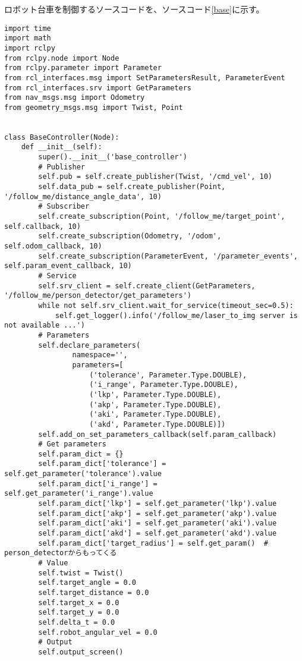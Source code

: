 ロボット台車を制御するソースコードを、ソースコード\ref{base}に示す。
\begin{lstlisting}[caption=base\_controller.py, label=base]
import time
import math
import rclpy
from rclpy.node import Node
from rclpy.parameter import Parameter
from rcl_interfaces.msg import SetParametersResult, ParameterEvent
from rcl_interfaces.srv import GetParameters
from nav_msgs.msg import Odometry
from geometry_msgs.msg import Twist, Point


class BaseController(Node):
    def __init__(self):
        super().__init__('base_controller')
        # Publisher
        self.pub = self.create_publisher(Twist, '/cmd_vel', 10)
        self.data_pub = self.create_publisher(Point, '/follow_me/distance_angle_data', 10)
        # Subscriber
        self.create_subscription(Point, '/follow_me/target_point', self.callback, 10)
        self.create_subscription(Odometry, '/odom', self.odom_callback, 10)
        self.create_subscription(ParameterEvent, '/parameter_events', self.param_event_callback, 10)
        # Service
        self.srv_client = self.create_client(GetParameters, '/follow_me/person_detector/get_parameters')
        while not self.srv_client.wait_for_service(timeout_sec=0.5):
            self.get_logger().info('/follow_me/laser_to_img server is not available ...')
        # Parameters
        self.declare_parameters(
                namespace='',
                parameters=[
                    ('tolerance', Parameter.Type.DOUBLE),
                    ('i_range', Parameter.Type.DOUBLE),
                    ('lkp', Parameter.Type.DOUBLE),
                    ('akp', Parameter.Type.DOUBLE),
                    ('aki', Parameter.Type.DOUBLE),
                    ('akd', Parameter.Type.DOUBLE)])
        self.add_on_set_parameters_callback(self.param_callback)
        # Get parameters
        self.param_dict = {}
        self.param_dict['tolerance'] = self.get_parameter('tolerance').value
        self.param_dict['i_range'] = self.get_parameter('i_range').value
        self.param_dict['lkp'] = self.get_parameter('lkp').value
        self.param_dict['akp'] = self.get_parameter('akp').value
        self.param_dict['aki'] = self.get_parameter('aki').value
        self.param_dict['akd'] = self.get_parameter('akd').value
        self.param_dict['target_radius'] = self.get_param()  # person_detectorからもってくる
        # Value
        self.twist = Twist()
        self.target_angle = 0.0
        self.target_distance = 0.0
        self.target_x = 0.0
        self.target_y = 0.0
        self.delta_t = 0.0
        self.robot_angular_vel = 0.0
        # Output
        self.output_screen()


\end{lstlisting}

